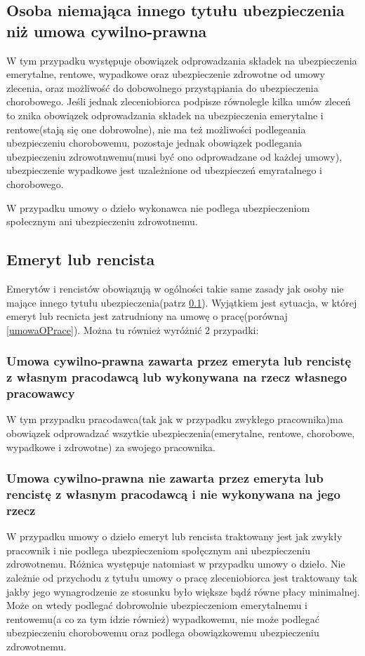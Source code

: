 \subsection[Osoba niemająca innego tytułu ubezpieczenia niż umowa cywilno-prawna][Osoba niemająca innego tytułu ubezpieczenia niż umowa cywilno-prawna]{Osoba niemająca innego tytułu ubezpieczenia niż umowa cywilno-prawna}
\label{inni}
W tym przypadku występuje obowiązek odprowadzania składek na ubezpieczenia emerytalne, rentowe, wypadkowe oraz ubezpieczenie zdrowotne od umowy zlecenia, oraz możliwość do dobowolnego przystąpiania do ubezpieczenia chorobowego. Jeśli jednak zleceniobiorca podpisze równolegle kilka umów zleceń to znika obowiązek odprowadzania składek na ubezpieczenia emerytalne i rentowe(stają się one dobrowolne), nie ma też możliwości podlegeania ubezpieczeniu chorobowemu, pozostaje jednak obowiązek podlegania ubezpieczeniu zdrowotnwemu(musi być ono odprowadzane od każdej umowy), ubezpieczenie wypadkowe jest uzależnione od ubezpieczeń emyratalnego i chorobowego.

W przypadku umowy o dzieło wykonawca nie podlega ubezpieczeniom społecznym ani ubezpieczeniu zdrowotnemu.

\subsection[Emeryt lub rencista][Emeryt lub rencista]{Emeryt lub rencista}
Emerytów i rencistów obowiązują w ogólności takie same zasady jak osoby nie mające innego tytułu ubezpieczenia(patrz \ref{inni}).
Wyjątkiem jest sytuacja, w której emeryt lub recnicta jest zatrudniony na umowę o pracę(porównaj \ref{umowaOPrace}). Można tu również wyróżnić 2 przypadki:

\subsubsection{Umowa cywilno-prawna zawarta przez emeryta lub rencistę z własnym pracodawcą lub wykonywana na rzecz własnego pracowawcy}
W tym przypadku pracodawca(tak jak w przypadku zwykłego pracownika)ma obowiązek odprowadzać wszytkie ubezpieczenia(emerytalne, rentowe, chorobowe, wypadkowe i zdrowotne) za swojego pracownika.

\subsubsection{Umowa cywilno-prawna nie zawarta przez emeryta lub rencistę z własnym pracodawcą i nie wykonywana na jego rzecz}
W przypadku umowy o dzieło emeryt lub rencista traktowany jest jak zwykły pracownik i nie podlega ubezpieczeniom społęcznym ani ubezpieczeniu zdrowotnemu. Różnica występuje natomiast w przypadku umowy o dzieło. Nie zależnie od przychodu z tytułu umowy o pracę zleceniobiorca jest traktowany tak jakby jego wynagrodzenie ze stosunku było większe bądź równe płacy minimalnej. Może on wtedy podlegać dobrowolnie ubezpieczeniom emerytalnemu i rentowemu(a co za tym idzie również) wypadkowemu, nie może podlegać ubezpieczeniu chorobowemu oraz podlega obowiązkowemu ubezpieczeniu zdrowotnemu.

